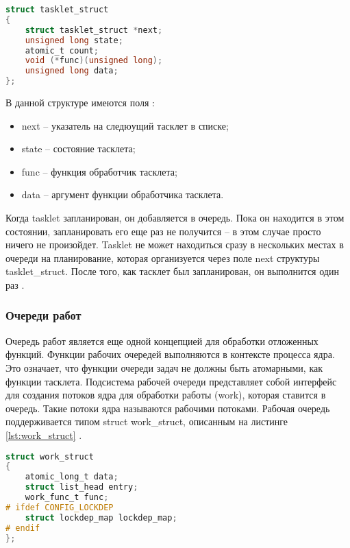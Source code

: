 \begin{lstlisting}[language=c,caption=Структура tasklet,label=lst:tasklet]
struct tasklet_struct
{
    struct tasklet_struct *next;
    unsigned long state;
    atomic_t count;
    void (*func)(unsigned long);
    unsigned long data;
};
\end{lstlisting}

В данной структуре имеются поля \cite{Tasklets}:

\begin{itemize}
    \item next -- указатель на следюущий тасклет в списке;
    \item state -- состояние тасклета;
    \item func -- функция обработчик тасклета;
    \item data -- аргумент функции обработчика тасклета.
\end{itemize}

Когда tasklet запланирован, он добавляется в очередь. Пока он находится в этом состоянии, запланировать его еще раз не получится -- в этом случае просто ничего не произойдет. Tasklet не может находиться сразу в нескольких местах в очереди на планирование, которая организуется через поле next структуры tasklet\_struct. После того, как тасклет был запланирован, он выполнится один раз \cite{Tasklets}.

\subsubsection{Очереди работ}

Очередь работ является еще одной концепцией для обработки отложенных функций. Функции рабочих очередей выполняются в контексте процесса ядра. Это означает, что функции очереди задач не должны быть атомарными, как функции тасклета. Подсистема рабочей очереди представляет собой интерфейс для создания потоков ядра для обработки работы (work), которая ставится в очередь. Такие потоки ядра называются рабочими потоками. Рабочая очередь поддерживается типом struct work\_struct, описанным на листинге \ref{lst:work_struct} \cite{WorkQueue}.

\begin{lstlisting}[language=c,caption=Структура work\_struct,label=lst:work_struct]
struct work_struct
{
    atomic_long_t data;
    struct list_head entry;
    work_func_t func;
# ifdef CONFIG_LOCKDEP
    struct lockdep_map lockdep_map;
# endif
};
\end{lstlisting}

